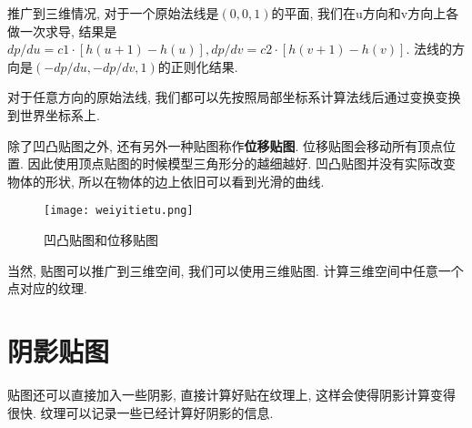 推广到三维情况, 对于一个原始法线是$(0,0,1)$的平面, 我们在u方向和v方向上各做一次求导, 结果是$dp/du=c1\cdot [h(u+1)-h(u)],dp/dv=c2\cdot [h(v+1)-h(v)]$. 法线的方向是$(-dp/du,-dp/dv,1)$的正则化结果. 

对于任意方向的原始法线, 我们都可以先按照局部坐标系计算法线后通过变换变换到世界坐标系上. 

除了凹凸贴图之外, 还有另外一种贴图称作\textbf{位移贴图}. 位移贴图会移动所有顶点位置. 因此使用顶点贴图的时候模型三角形分的越细越好. 凹凸贴图并没有实际改变物体的形状, 所以在物体的边上依旧可以看到光滑的曲线. 
\begin{figure}[H]
	\centering
	\texttt{[image: weiyitietu.png]}
	\caption{凹凸贴图和位移贴图}
	\label{fig:weiyitietu}
\end{figure}

当然, 贴图可以推广到三维空间, 我们可以使用三维贴图. 计算三维空间中任意一个点对应的纹理. 

\section{阴影贴图}
贴图还可以直接加入一些阴影, 直接计算好贴在纹理上, 这样会使得阴影计算变得很快. 纹理可以记录一些已经计算好阴影的信息. 
